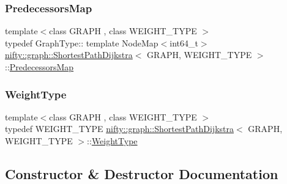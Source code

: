\subsubsection{\texorpdfstring{Predecessors\+Map}{PredecessorsMap}}
{\footnotesize\ttfamily template$<$class G\+R\+A\+PH , class W\+E\+I\+G\+H\+T\+\_\+\+T\+Y\+PE $>$ \\
typedef Graph\+Type\+:: template Node\+Map$<$int64\+\_\+t$>$ \hyperlink{classnifty_1_1graph_1_1ShortestPathDijkstra}{nifty\+::graph\+::\+Shortest\+Path\+Dijkstra}$<$ G\+R\+A\+PH, W\+E\+I\+G\+H\+T\+\_\+\+T\+Y\+PE $>$\+::\hyperlink{classnifty_1_1graph_1_1ShortestPathDijkstra_a87227c1cb37963c6a826889c693ab906}{Predecessors\+Map}}

\mbox{\label{classnifty_1_1graph_1_1ShortestPathDijkstra_a99783a7c717b74f48226852d73844fed}} 
\subsubsection{\texorpdfstring{Weight\+Type}{WeightType}}
{\footnotesize\ttfamily template$<$class G\+R\+A\+PH , class W\+E\+I\+G\+H\+T\+\_\+\+T\+Y\+PE $>$ \\
typedef W\+E\+I\+G\+H\+T\+\_\+\+T\+Y\+PE \hyperlink{classnifty_1_1graph_1_1ShortestPathDijkstra}{nifty\+::graph\+::\+Shortest\+Path\+Dijkstra}$<$ G\+R\+A\+PH, W\+E\+I\+G\+H\+T\+\_\+\+T\+Y\+PE $>$\+::\hyperlink{classnifty_1_1graph_1_1ShortestPathDijkstra_a99783a7c717b74f48226852d73844fed}{Weight\+Type}}



\subsection{Constructor \& Destructor Documentation}
\mbox{\label{classnifty_1_1graph_1_1ShortestPathDijkstra_a4ac2678953bd864c66d86b1c0b624d8b}} 
